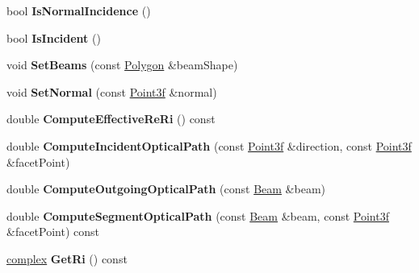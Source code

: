 \begin{DoxyCompactItemize}
bool {\bfseries Is\+Normal\+Incidence} ()
\item 
\mbox{\label{class_splitting_a7bb4e4251d8d414e040895145129fbc4}} 
bool {\bfseries Is\+Incident} ()
\item 
\mbox{\label{class_splitting_a7112b68ba0d5c715628916c780e93f95}} 
void {\bfseries Set\+Beams} (const \mbox{\hyperlink{class_polygon}{Polygon}} \&beam\+Shape)
\item 
\mbox{\label{class_splitting_aa1252b1e8aee523ea0ab4ee722ef7467}} 
void {\bfseries Set\+Normal} (const \mbox{\hyperlink{struct_point3f}{Point3f}} \&normal)
\item 
\mbox{\label{class_splitting_a758d5a6c2893c082764112986455f8bb}} 
double {\bfseries Compute\+Effective\+Re\+Ri} () const
\item 
\mbox{\label{class_splitting_a5dbc1990cfed9334c579bc3b0a882e52}} 
double {\bfseries Compute\+Incident\+Optical\+Path} (const \mbox{\hyperlink{struct_point3f}{Point3f}} \&direction, const \mbox{\hyperlink{struct_point3f}{Point3f}} \&facet\+Point)
\item 
\mbox{\label{class_splitting_a354a90a3b99b3428b165843e45512542}} 
double {\bfseries Compute\+Outgoing\+Optical\+Path} (const \mbox{\hyperlink{class_beam}{Beam}} \&beam)
\item 
\mbox{\label{class_splitting_abd26e93fb5f2386407ff26f29707c699}} 
double {\bfseries Compute\+Segment\+Optical\+Path} (const \mbox{\hyperlink{class_beam}{Beam}} \&beam, const \mbox{\hyperlink{struct_point3f}{Point3f}} \&facet\+Point) const
\item 
\mbox{\label{class_splitting_a7be9d71b2d09439747480d4f3446cc2f}} 
\mbox{\hyperlink{classcomplex}{complex}} {\bfseries Get\+Ri} () const
\end{DoxyCompactItemize}
